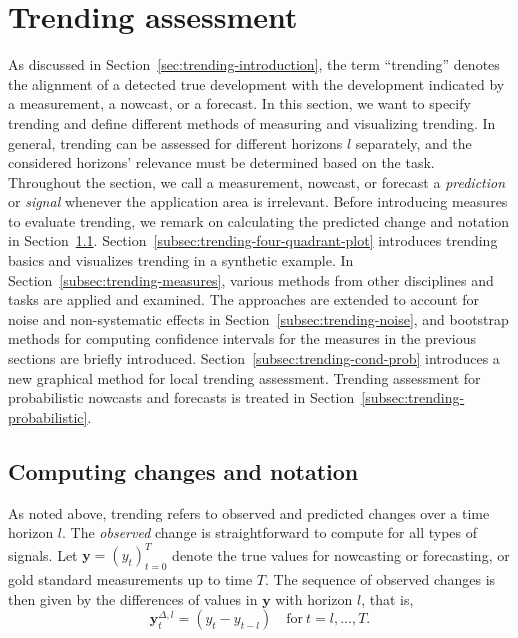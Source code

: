 \documentclass[pdflatex]{sn-jnl}
\theoremstyle{plain}%
\theoremstyle{definition}
\newcommand{\diffylt}{\mathbf{y}^{\Delta,l}_t}
\begin{document}
\section{Trending assessment}\label{sec:trending}


As discussed in Section~\ref{sec:trending-introduction}, the term \enquote{trending} denotes the alignment of a detected true development with the development indicated by a measurement, a nowcast, or a forecast.
In this section, we want to specify trending and define different methods of measuring and visualizing trending.
In general, trending can be assessed for different horizons $l$ separately, and the considered horizons' relevance must be determined based on the task.
Throughout the section, we call a measurement, nowcast, or forecast a \textit{prediction} or \textit{signal} whenever the application area is irrelevant.
Before introducing measures to evaluate trending, we remark on calculating the predicted change and notation in Section~\ref{subsec:notation}.
Section~\ref{subsec:trending-four-quadrant-plot} introduces trending basics and visualizes trending in a synthetic example.
In Section~\ref{subsec:trending-measures}, various methods from other disciplines and tasks are applied and examined.
The approaches are extended to account for noise and non-systematic effects in Section~\ref{subsec:trending-noise}, and bootstrap methods for computing confidence intervals for the measures in the previous sections are briefly introduced.
Section~\ref{subsec:trending-cond-prob} introduces a new graphical method for local trending assessment.
Trending assessment for probabilistic nowcasts and forecasts is treated in Section~\ref{subsec:trending-probabilistic}.

\subsection{Computing changes and notation}\label{subsec:notation}

As noted above, trending refers to observed and predicted changes over a time horizon $l$.
The \textit{observed} change is straightforward to compute for all types of signals.
Let $\mathbf{y} = (y_t)_{t=0}^T$ denote the true values for nowcasting or forecasting, or gold standard measurements up to time $T$.
The sequence of observed changes is then given by the differences of values in $\mathbf{y}$ with horizon $l$, that is,
\begin{equation}\label{eq:diffy}
    \diffylt = (y_{t} - y_{t-l}) \quad \text{for}\ t = l, \dots, T.
\end{equation}
\end{document}
